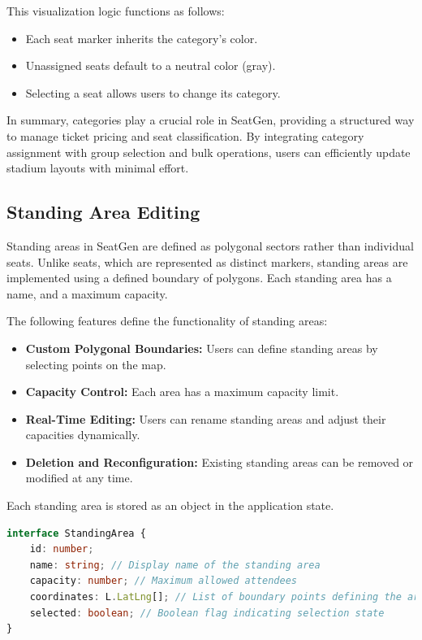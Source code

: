 This visualization logic functions as follows:
\begin{itemize}
    \item Each seat marker inherits the category's color.
    \item Unassigned seats default to a neutral color (gray).
    \item Selecting a seat allows users to change its category.
\end{itemize}

In summary, categories play a crucial role in SeatGen, providing a structured way to manage ticket pricing and seat classification. By integrating category assignment with group selection and bulk operations, users can efficiently update stadium layouts with minimal effort.

\subsection{Standing Area Editing}
Standing areas in SeatGen are defined as polygonal sectors rather than individual seats. Unlike seats, which are represented as distinct markers, standing areas are implemented using a defined boundary of polygons. Each standing area has a name, and a maximum capacity.

The following features define the functionality of standing areas:
\begin{itemize}
    \item \textbf{Custom Polygonal Boundaries:} Users can define standing areas by selecting points on the map.
    \item \textbf{Capacity Control:} Each area has a maximum capacity limit.
    \item \textbf{Real-Time Editing:} Users can rename standing areas and adjust their capacities dynamically.
    \item \textbf{Deletion and Reconfiguration:} Existing standing areas can be removed or modified at any time.
\end{itemize}

Each standing area is stored as an object in the application state.

\begin{lstlisting}[language=TypeScript, caption=Standing Area Data Model, label=lst:standingarea-model]
interface StandingArea {
    id: number;
    name: string; // Display name of the standing area
    capacity: number; // Maximum allowed attendees
    coordinates: L.LatLng[]; // List of boundary points defining the area
    selected: boolean; // Boolean flag indicating selection state
}
\end{lstlisting}

